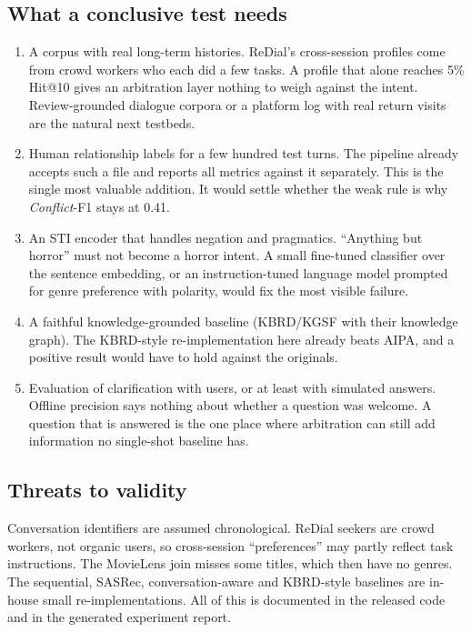 \subsection{What a conclusive test needs}
\begin{enumerate}
  \item A corpus with real long-term histories. ReDial's cross-session profiles come from crowd workers who each did a few tasks. A profile that alone reaches 5\% Hit@10 gives an arbitration layer nothing to weigh against the intent. Review-grounded dialogue corpora or a platform log with real return visits are the natural next testbeds.
  \item Human relationship labels for a few hundred test turns. The pipeline already accepts such a file and reports all metrics against it separately. This is the single most valuable addition. It would settle whether the weak rule is why \emph{Conflict}-F1 stays at 0.41.
  \item An STI encoder that handles negation and pragmatics. ``Anything but horror'' must not become a horror intent. A small fine-tuned classifier over the sentence embedding, or an instruction-tuned language model prompted for genre preference with polarity, would fix the most visible failure.
  \item A faithful knowledge-grounded baseline (KBRD/KGSF with their knowledge graph). The KBRD-style re-implementation here already beats AIPA, and a positive result would have to hold against the originals.
  \item Evaluation of clarification with users, or at least with simulated answers. Offline precision says nothing about whether a question was welcome. A question that is answered is the one place where arbitration can still add information no single-shot baseline has.
\end{enumerate}

\subsection{Threats to validity}
Conversation identifiers are assumed chronological. ReDial seekers are crowd workers, not organic users, so cross-session ``preferences'' may partly reflect task instructions. The MovieLens join misses some titles, which then have no genres. The sequential, SASRec, conversation-aware and KBRD-style baselines are in-house small re-implementations. All of this is documented in the released code and in the generated experiment report.

